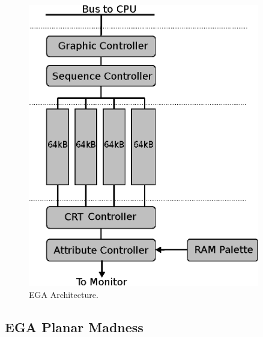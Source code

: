 \documentclass[book.tex]{subfiles}
\begin{document}
\begin{figure}[H]
\centering
\includegraphics[width=0.9\textwidth]{imgs/drawings/ega.eps}
\caption{EGA Architecture.}
\label{fig:vga_arch}
\end{figure}




\subsection{EGA Planar Madness}
\end{document}
